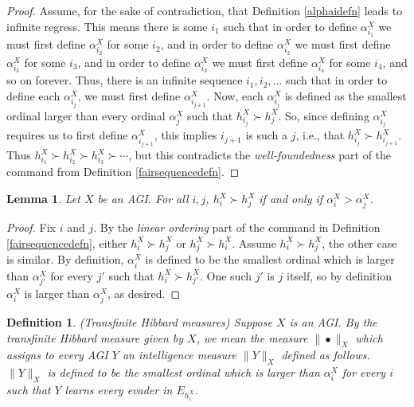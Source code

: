\documentclass{article}
\newtheorem{definition}[theorem]{Definition}
\newtheorem{lemma}[theorem]{Lemma}
\begin{document}
\begin{proof}
    Assume, for the sake of contradiction, that Definition \ref{alphaidefn}
    leads to infinite regress. This means there is some $i_1$ such that
    in order to define $\alpha^X_{i_1}$ we must first define $\alpha^X_{i_2}$
    for some $i_2$, and in order to define $\alpha^X_{i_2}$ we must first
    define $\alpha^X_{i_3}$ for some $i_3$, and in order to define
    $\alpha^X_{i_3}$ we must first define $\alpha^X_{i_4}$ for some $i_4$,
    and so on forever. Thus, there is an infinite sequence $i_1,i_2,\ldots$
    such that in order to define each $\alpha^X_{i_j}$, we must first
    define $\alpha^X_{i_{j+1}}$. Now, each $\alpha^X_{i_j}$ is defined as
    the smallest ordinal larger than every ordinal $\alpha^X_j$ such that
    $h^X_{i_j}\succ h^X_j$. So, since defining $\alpha^X_{i_j}$ requires
    us to first define $\alpha^X_{i_{j+1}}$, this implies $i_{j+1}$ is
    such a $j$, i.e., that $h^X_{i_j}\succ h^X_{i_{j+1}}$.
    Thus $h^X_{i_1}\succ h^X_{i_2}\succ h^X_{i_3}\succ\cdots$,
    but this contradicts the \emph{well-foundedness} part of the command
    from Definition \ref{fairsequencedefn}.
\end{proof}

\begin{lemma}
    Let $X$ be an AGI. For all $i,j$,
    $h^X_i\succ h^X_j$ if and only if $\alpha^X_i>\alpha^X_j$.
\end{lemma}

\begin{proof}
    Fix $i$ and $j$.
    By the \emph{linear ordering} part of the command in Definition
    \ref{fairsequencedefn}, either $h^X_i\succ h^X_j$ or $h^X_j\succ h^X_i$.
    Assume $h^X_i\succ h^X_j$, the other case is similar.
    By definition, $\alpha^X_i$ is defined to be the smallest ordinal
    which is larger than $\alpha^X_{j'}$ for every $j'$ such that
    $h^X_i\succ h^X_{j'}$. One such $j'$ is $j$ itself,
    so by definition $\alpha^X_i$ is larger than $\alpha^X_j$, as desired.
\end{proof}

\begin{definition}
    (Transfinite Hibbard measures)
    Suppose $X$ is an AGI. By the \emph{transfinite Hibbard measure given by $X$},
    we mean the measure $\|\bullet\|_X$ which assigns to every AGI $Y$ an
    intelligence measure $\|Y\|_X$ defined as follows.
    $\|Y\|_X$ is defined to be the smallest ordinal which is larger than
    $\alpha^X_i$ for every $i$ such that $Y$ learns every evader in
    $E_{h^X_i}$.
\end{definition}
\end{document}
